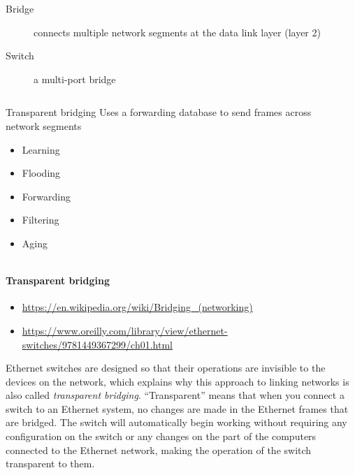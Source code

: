 \begin{frame}
  \begin{description}
  \item[Bridge] connects multiple network segments at the data link layer (layer 2)
  \item[Switch] a multi-port bridge
  \end{description}
  \begin{columns}[b]
    \begin{column}{.45\linewidth}
      \begin{iblock}{Transparent bridging}
        Uses a forwarding database to send frames across network segments
        \begin{itemize}
        \item Learning
        \item Flooding
        \item Forwarding
        \item Filtering
        \item Aging
        \end{itemize}
      \end{iblock}
    \end{column}
    \begin{column}{.55\linewidth}
      \mode<beamer>{\texttt{[image: switch]}}%
    \end{column}
  \end{columns}
\end{frame}

\paragraph{Transparent bridging}

\begin{itemize}
\item \url{https://en.wikipedia.org/wiki/Bridging_(networking)}
\item \url{https://www.oreilly.com/library/view/ethernet-switches/9781449367299/ch01.html}
\end{itemize}

Ethernet switches are designed so that their operations are invisible to the devices on
the network, which explains why this approach to linking networks is also called
\emph{transparent bridging}. “Transparent” means that when you connect a switch to an Ethernet
system, no changes are made in the Ethernet frames that are bridged. The switch will
automatically begin working without requiring any configuration on the switch or any
changes on the part of the computers connected to the Ethernet network, making the
operation of the switch transparent to them.

